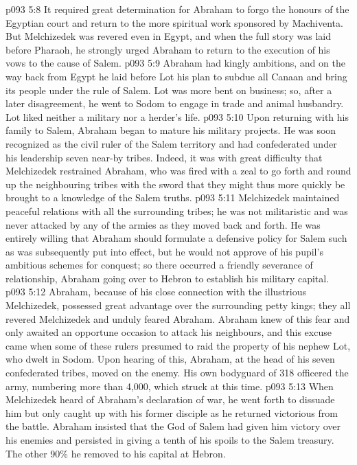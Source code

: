 \vs p093 5:8 It required great determination for Abraham to forgo the honours of the Egyptian court and return to the more spiritual work sponsored by Machiventa. But Melchizedek was revered even in Egypt, and when the full story was laid before Pharaoh, he strongly urged Abraham to return to the execution of his vows to the cause of Salem.
\vs p093 5:9 \pc Abraham had kingly ambitions, and on the way back from Egypt he laid before Lot his plan to subdue all Canaan and bring its people under the rule of Salem. Lot was more bent on business; so, after a later disagreement, he went to Sodom to engage in trade and animal husbandry. Lot liked neither a military nor a herder’s life.
\vs p093 5:10 Upon returning with his family to Salem, Abraham began to mature his military projects. He was soon recognized as the civil ruler of the Salem territory and had confederated under his leadership seven near\hyp{}by tribes. Indeed, it was with great difficulty that Melchizedek restrained Abraham, who was fired with a zeal to go forth and round up the neighbouring tribes with the sword that they might thus more quickly be brought to a knowledge of the Salem truths.
\vs p093 5:11 Melchizedek maintained peaceful relations with all the surrounding tribes; he was not militaristic and was never attacked by any of the armies as they moved back and forth. He was entirely willing that Abraham should formulate a defensive policy for Salem such as was subsequently put into effect, but he would not approve of his pupil’s ambitious schemes for conquest; so there occurred a friendly severance of relationship, Abraham going over to Hebron to establish his military capital.
\vs p093 5:12 Abraham, because of his close connection with the illustrious Melchizedek, possessed great advantage over the surrounding petty kings; they all revered Melchizedek and unduly feared Abraham. Abraham knew of this fear and only awaited an opportune occasion to attack his neighbours, and this excuse came when some of these rulers presumed to raid the property of his nephew Lot, who dwelt in Sodom. Upon hearing of this, Abraham, at the head of his seven confederated tribes, moved on the enemy. His own bodyguard of 318 officered the army, numbering more than 4,000, which struck at this time.
\vs p093 5:13 When Melchizedek heard of Abraham’s declaration of war, he went forth to dissuade him but only caught up with his former disciple as he returned victorious from the battle. Abraham insisted that the God of Salem had given him victory over his enemies and persisted in giving a tenth of his spoils to the Salem treasury. The other 90\% he removed to his capital at Hebron.
